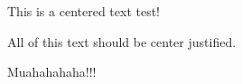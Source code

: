 \documentclass[letterpaper,portrait,12pt]{article}
\begin{document}
\setlength{\oddsidemargin}{0.7874in-1in}
\setlength{\textwidth}{\paperwidth - 0.7874in-0.7874in}

\begin{center}
This is a centered text test!
\end{center}


\begin{center}

\end{center}


\begin{center}

\end{center}


\begin{center}
All of this text should be center justified.
\end{center}


\begin{center}

\end{center}


\begin{center}

\end{center}


\begin{center}
Muahahahaha!!!
\end{center}
\end{document}
